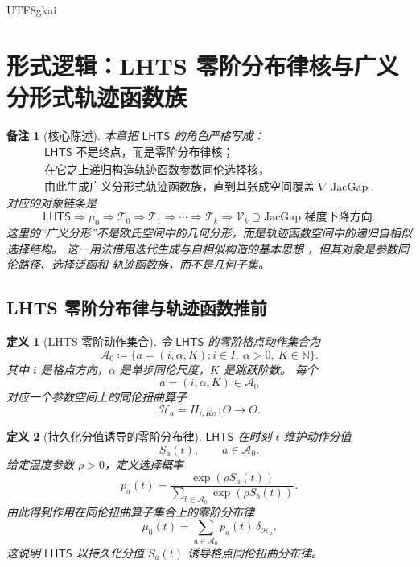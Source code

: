 \documentclass[12pt]{article}
\newtheorem{definition}{定义}[section]
\newtheorem{remark}{备注}[section]
\newcommand{\NN}{\mathbb{N}}
\newcommand{\LHTS}{\ensuremath{\mathsf{LHTS}}}
\newcommand{\DefEq}{\coloneqq}
\DeclareMathOperator{\JacGap}{JacGap}
\begin{document}
\begin{CJK*}{UTF8}{gkai}
\clearpage

\section{形式逻辑：LHTS 零阶分布律核与广义分形式轨迹函数族}
\label{sec:tex57-lhts-fractal-jacgap-cover}

\begin{remark}[核心陈述]
本章把 \LHTS{} 的角色严格写成：
\[
\boxed{
\begin{gathered}
\LHTS{}\text{ 不是终点，而是零阶分布律核；}\\
\text{在它之上递归构造轨迹函数参数同伦选择核，}\\
\text{由此生成广义分形式轨迹函数族，直到其张成空间覆盖 }\nabla\JacGap.
\end{gathered}
}
\]
对应的对象链条是
\[
\boxed{
\LHTS{}
\Longrightarrow
\mu_0
\Longrightarrow
\mathcal T_0
\Longrightarrow
\mathcal T_1
\Longrightarrow
\cdots
\Longrightarrow
\mathcal T_k
\Longrightarrow
\mathcal V_k
\supseteq
\text{JacGap 梯度下降方向}.
}
\]
这里的“广义分形”不是欧氏空间中的几何分形，而是轨迹函数空间中的递归自相似选择结构。
这一用法借用迭代生成与自相似构造的基本思想
\cite{Hutchinson1981Fractals,Barnsley1988Fractals}，但其对象是参数同伦路径、选择泛函和
轨迹函数族，而不是几何子集。
\end{remark}

\subsection{LHTS 零阶分布律与轨迹函数推前}
\label{subsec:tex57-lhts-zero-law}

\begin{definition}[LHTS 零阶动作集合]
\label{def:tex57-lhts-action-set}
令 \(\LHTS{}\) 的零阶格点动作集合为
\[
  \mathcal A_0
  \DefEq
  \{a=(i,\alpha,K): i\in I,\ \alpha>0,\ K\in\NN\}.
\]
其中 \(i\) 是格点方向，\(\alpha\) 是单步同伦尺度，\(K\) 是跳跃阶数。
每个
\[
  a=(i,\alpha,K)\in\mathcal A_0
\]
对应一个参数空间上的同伦扭曲算子
\[
  \mathscr H_a
  =
  H_{i,K\alpha}:\Theta\to\Theta.
\]
\end{definition}

\begin{definition}[持久化分值诱导的零阶分布律]
\label{def:tex57-lhts-zero-law}
\(\LHTS{}\) 在时刻 \(t\) 维护动作分值
\[
  S_a(t),
  \qquad
  a\in\mathcal A_0.
\]
给定温度参数 \(\rho>0\)，定义选择概率
\[
  p_a(t)
  =
  \frac{\exp(\rho S_a(t))}
  {\sum_{b\in\mathcal A_0}\exp(\rho S_b(t))}.
\]
由此得到作用在同伦扭曲算子集合上的零阶分布律
\[
  \boxed{
  \mu_0(t)
  =
  \sum_{a\in\mathcal A_0}
  p_a(t)\,\delta_{\mathscr H_a}.
  }
\]
这说明 \(\LHTS{}\) 以持久化分值 \(S_a(t)\) 诱导格点同伦扭曲分布律。
\end{definition}


\end{CJK*}
\end{document}
